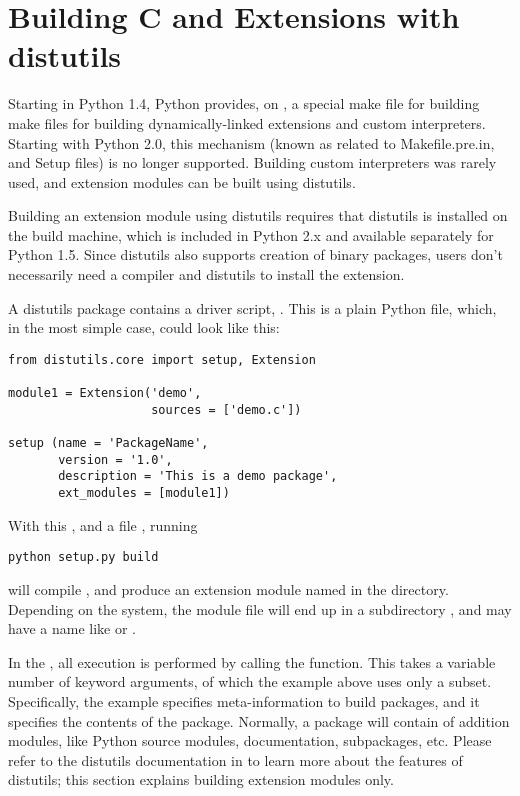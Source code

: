 \chapter{Building C and \Cpp{} Extensions with distutils
     \label{building}}


Starting in Python 1.4, Python provides, on \UNIX{}, a special make
file for building make files for building dynamically-linked
extensions and custom interpreters.  Starting with Python 2.0, this
mechanism (known as related to Makefile.pre.in, and Setup files) is no
longer supported. Building custom interpreters was rarely used, and
extension modules can be built using distutils.

Building an extension module using distutils requires that distutils
is installed on the build machine, which is included in Python 2.x and
available separately for Python 1.5. Since distutils also supports
creation of binary packages, users don't necessarily need a compiler
and distutils to install the extension.

A distutils package contains a driver script, . This is
a plain Python file, which, in the most simple case, could look like
this:

\begin{verbatim}
from distutils.core import setup, Extension

module1 = Extension('demo',
                    sources = ['demo.c'])

setup (name = 'PackageName',
       version = '1.0',
       description = 'This is a demo package',
       ext_modules = [module1])

\end{verbatim}

With this , and a file , running

\begin{verbatim}
python setup.py build 
\end{verbatim}

will compile , and produce an extension module named
 in the  directory. Depending on the system,
the module file will end up in a subdirectory ,
and may have a name like  or .

In the , all execution is performed by calling the
 function. This takes a variable number of keyword 
arguments, of which the example above uses only a
subset. Specifically, the example specifies meta-information to build
packages, and it specifies the contents of the package.  Normally, a
package will contain of addition modules, like Python source modules,
documentation, subpackages, etc. Please refer to the distutils
documentation in  to learn more about the features of distutils; this section
explains building extension modules only.

